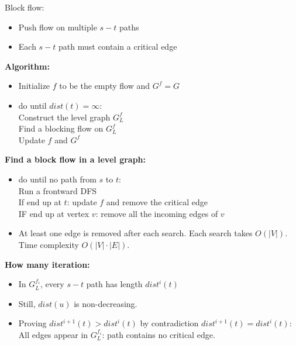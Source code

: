 \documentclass[10pt, a4paper, twocolumn]{article}
\begin{document}
\begin{enumerate}[leftmargin = 12pt, topsep = 0pt, itemsep=0pt, partopsep = 0pt]
\begin{itemize}[leftmargin = 12pt, topsep = 0pt, itemsep=0pt, partopsep = 0pt]
        \end{itemize}
        Block flow:
        \begin{itemize}[leftmargin = 12pt, topsep = 0pt, itemsep=0pt, partopsep = 0pt]
        \item Push flow on multiple $s-t$ paths
        \item Each $s-t$ path must contain a critical edge
        \end{itemize}
        \textbf{Algorithm:}
        \begin{itemize}[leftmargin = 12pt, topsep = 0pt, itemsep=0pt, partopsep = 0pt]
        \item Initialize $f$ to be the empty flow and $G^f=G$
        \item do until $dist(t) = \infty$:\\
            Construct the level graph $G^f_L$\\
            Find a blocking flow on $G^f_L$\\
            Update $f$ and $G^f$\\
        \end{itemize}
        \vspace{-0.5cm}
        \textbf{Find a block flow in a level graph:}
        \begin{itemize}[leftmargin = 12pt, topsep = 0pt, itemsep=0pt, partopsep = 0pt]
        \item do until no path from $s$ to $t$:\\
            Run a frontward DFS\\
            If end up at $t$: update $f$ and remove the critical edge\\
            IF end up at vertex $v$: remove all the incoming edges of $v$
        \item At least one edge is removed after each search. Each search takes $O(|V|)$. Time complexity $O(|V|\cdot|E|)$.
        \end{itemize}
        \textbf{How many iteration:}
        \begin{itemize}[leftmargin = 12pt, topsep = 0pt, itemsep=0pt, partopsep = 0pt]
        \item In $G^{f_i}_L$, every $s-t$ path has length $dist^i(t)$
        \item Still, $dist(u)$ is non-decreasing.
        \item Proving $dist^{i+1}(t)>dist^i(t)$ by contradiction $dist^{i+1}(t)=dist^i(t)$:\\
            All edges appear in $G^{f_i}_L$: path contains no critical edge.\\

\end{itemize}
\end{enumerate}
\end{document}
